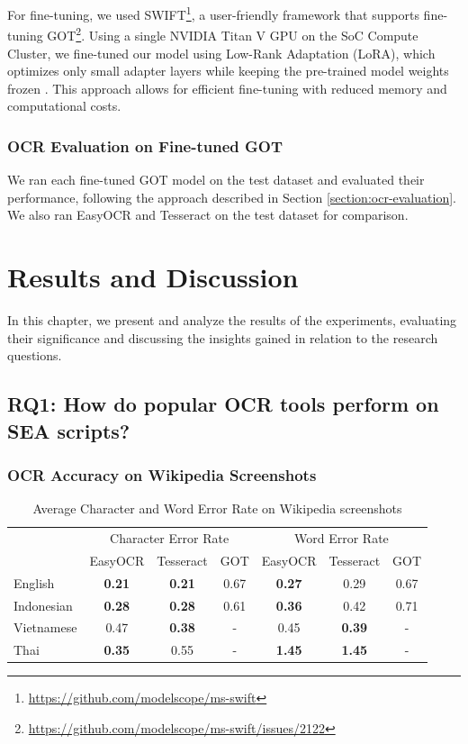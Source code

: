 \documentclass[12pt,oneside]{memoir}
\begin{document}
For fine-tuning, we used SWIFT\footnote{\url{https://github.com/modelscope/ms-swift}}, a user-friendly framework that supports fine-tuning GOT\footnote{\url{https://github.com/modelscope/ms-swift/issues/2122}}. 
Using a single NVIDIA Titan V GPU on the SoC Compute Cluster, we fine-tuned our model using Low-Rank Adaptation (LoRA), which optimizes only small adapter layers while keeping the pre-trained model weights frozen \parencite{hu-etal-2021}.
This approach allows for efficient fine-tuning with reduced memory and computational costs.

\subsection{OCR Evaluation on Fine-tuned GOT}

We ran each fine-tuned GOT model on the test dataset and evaluated their performance, following the approach described in Section \ref{section:ocr-evaluation}.
We also ran EasyOCR and Tesseract on the test dataset for comparison.

\chapter{Results and Discussion}

In this chapter, we present and analyze the results of the experiments, evaluating their significance and discussing the insights gained in relation to the research questions.

\section{RQ1: How do popular OCR tools perform on SEA scripts?}

\subsection{OCR Accuracy on Wikipedia Screenshots}

\begin{table}[ht]
    \centering
    \caption{Average Character and Word Error Rate on Wikipedia screenshots}
    \label{table:ocr-accuracy-on-real-world-data}
    \begin{tabular}{lcccccc}
        \toprule
        & \multicolumn{3}{c}{Character Error Rate} & \multicolumn{3}{c}{Word Error Rate}\\
        \cmidrule(lr){2-4}\cmidrule(lr){5-7}
        & EasyOCR & Tesseract & GOT & EasyOCR & Tesseract & GOT\\
        \midrule
        English & \textbf{0.21} & \textbf{0.21} & 0.67 & \textbf{0.27} & 0.29 & 0.67\\
        Indonesian & \textbf{0.28} & \textbf{0.28} & 0.61 & \textbf{0.36} & 0.42 & 0.71\\
        Vietnamese & 0.47 & \textbf{0.38} & - & 0.45 & \textbf{0.39} & -\\
        Thai & \textbf{0.35} & 0.55 & - & \textbf{1.45} & \textbf{1.45} & -\\
        \bottomrule
    \end{tabular}
\end{table}
\end{document}
